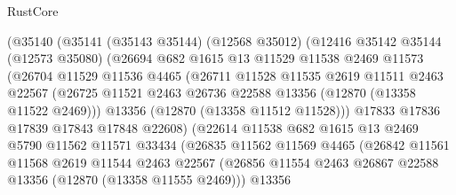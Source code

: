 \begin{lexlean}{RustCore}
\begin{coremodule}
                  (@35140
                    (@35141
                      (@35143 @35144)
                      (@12568 @35012)
                      (@12416
                        @35142
                        @35144
                        (@12573 @35080)
                        (@26694
                          @682
                          @1615
                          @13
                          @11529
                          @11538
                          @2469
                          @11573
                          (@26704
                            @11529
                            @11536
                            @4465
                            (@26711
                              @11528
                              @11535
                              @2619
                              @11511
                              @2463
                              @22567
                              (@26725
                                @11521
                                @2463
                                @26736
                                @22588
                                @13356
                                (@12870 (@13358 @11522 @2469)))
                              @13356
                              (@12870 (@13358 @11512 @11528)))
                            @17833
                            @17836
                            @17839
                            @17843
                            @17848
                            @22608)
                          (@22614
                            @11538
                            @682
                            @1615
                            @13
                            @2469
                            @5790
                            @11562
                            @11571
                            @33434
                            (@26835
                              @11562
                              @11569
                              @4465
                              (@26842
                                @11561
                                @11568
                                @2619
                                @11544
                                @2463
                                @22567
                                (@26856
                                  @11554
                                  @2463
                                  @26867
                                  @22588
                                  @13356
                                  (@12870 (@13358 @11555 @2469)))
                                @13356

\end{coremodule}
\end{lexlean}
